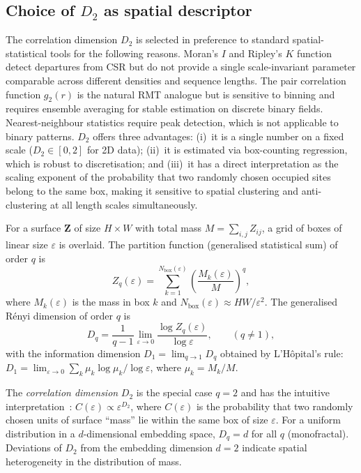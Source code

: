 \documentclass[final,1p,times]{elsarticle}
\theoremstyle{definition}
\begin{document}
\subsection{Choice of $D_2$ as spatial descriptor}

The correlation dimension $D_2$ is selected in preference to
standard spatial-statistical tools for the following reasons.
Moran's $I$ and Ripley's $K$ function detect departures from CSR
but do not provide a single scale-invariant parameter comparable
across different densities and sequence lengths. The pair
correlation function $g_2(r)$ is the natural RMT analogue but is
sensitive to binning and requires ensemble averaging for stable
estimation on discrete binary fields. Nearest-neighbour statistics
require peak detection, which is not applicable to binary patterns.
$D_2$ offers three advantages: (i)~it is a single number on a fixed
scale ($D_2 \in [0,2]$ for 2D data); (ii)~it is estimated via
box-counting regression, which is robust to discretisation; and
(iii)~it has a direct interpretation as the scaling exponent of
the probability that two randomly chosen occupied sites belong to
the same box, making it sensitive to spatial clustering and
anti-clustering at all length scales simultaneously.

For a surface $\mathbf{Z}$ of size $H \times W$ with total mass
$M = \sum_{i,j} Z_{ij}$, a grid of boxes of linear size $\varepsilon$
is overlaid. The partition function (generalised statistical sum) of
order $q$ is
\begin{equation}
  Z_q(\varepsilon) = \sum_{k=1}^{N_{\text{box}}(\varepsilon)}
  \left(\frac{M_k(\varepsilon)}{M}\right)^q,
  \label{eq:partfun}
\end{equation}
where $M_k(\varepsilon)$ is the mass in box $k$ and
$N_{\text{box}}(\varepsilon) \approx HW/\varepsilon^2$. The generalised
R\'enyi dimension of order $q$ is~\cite{RENYI-DIMENSIONS, HENTSCHEL-PROCACCIA-1983}
\begin{equation}
  D_q = \frac{1}{q-1} \lim_{\varepsilon \to 0}
        \frac{\log Z_q(\varepsilon)}{\log \varepsilon},
        \qquad (q \neq 1),
  \label{eq:Dq}
\end{equation}
with the information dimension $D_1 = \lim_{q \to 1} D_q$ obtained by
L'H\^opital's rule:
$D_1 = \lim_{\varepsilon \to 0} \sum_k \mu_k \log \mu_k / \log \varepsilon$,
where $\mu_k = M_k/M$.

The \emph{correlation dimension} $D_2$ is the special case $q=2$ and
has the intuitive interpretation~\cite{GRASSBERGER-PROCACCIA-1983}:
$C(\varepsilon) \propto \varepsilon^{D_2}$, where $C(\varepsilon)$ is
the probability that two randomly chosen units of surface ``mass'' lie
within the same box of size $\varepsilon$. For a uniform distribution
in a $d$-dimensional embedding space, $D_q = d$ for all $q$
(monofractal). Deviations of $D_2$ from the embedding dimension $d=2$
indicate spatial heterogeneity in the distribution of mass.
\end{document}
